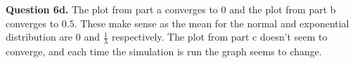 \documentclass[letterpaper, reqno,11pt]{article}
\begin{document}
{\medskip\noindent\bf Question 6d.} The plot from part a converges to $0$ and the plot from part b converges to $0.5$. These make sense as the mean for the normal and exponential distribution are $0$ and $\frac{1}{\lambda}$ respectively. The plot from part c doesn't seem to converge, and each time the simulation is run the graph seems to change. 
\end{document}
